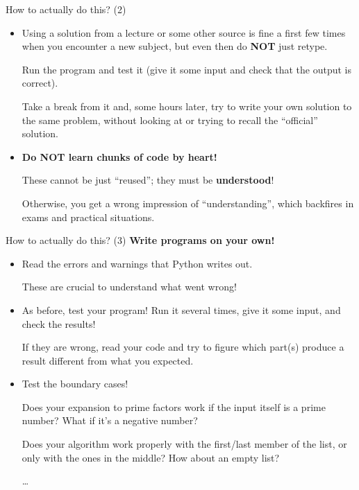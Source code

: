 \documentclass[xcolor=dvipsnames, 12pt]{beamer}
\newcommand{\MYTITLECOLOUR} {\textcolor[rgb]{1.,0.85,0.}}  %
\newenvironment{myFrame}[1]%
{\begin{frame}{\MYTITLECOLOUR{#1}}}%
{\end{frame}}
\begin{document}
\begin{myFrame}{How to actually do this? (2)}
\begin{itemize}
  \item Using a solution from a lecture or some other source is fine a \alert{first few times} when you encounter a new subject, but even then do \alert{\bfseries NOT} just retype.\par
    Run the program and \alert{test it} (give it some input and check that the output is correct). \par
{}
    Take a break from it and, some hours later, \alert{try to write your own solution} to the same problem, without looking at or trying to recall the ``official'' solution.
  \item \alert{\bfseries Do NOT learn chunks of code by heart!} \par
    These cannot be just ``reused''; \alert{they must be {\bfseries understood}!} \par
    Otherwise, you get a wrong impression of ``understanding'', which \alert{backfires} in exams and practical situations.
\end{itemize}
\end{myFrame}

\begin{myFrame}{How to actually do this? (3)}{}
{\large\bfseries Write programs on your own!}
\begin{itemize}
  \item \alert{Read the errors and warnings} that Python writes out. \par
    These are crucial to understand what went wrong!
  \item As before, \alert{test your program!} Run it several times, give it some input, and \alert{check the results}! \par
    If they are wrong, read your code and try to figure which part(s) produce a result different from what you expected.
  \item Test the \alert{boundary cases}! \par
    Does your expansion to prime factors work if the input itself is a prime number? What if it's a negative number? \par
    Does your algorithm work properly with the first/last member of the list, or only with the ones in the middle? How about an empty list? \par
    \dots
\end{itemize}
\end{myFrame}
\end{document}
